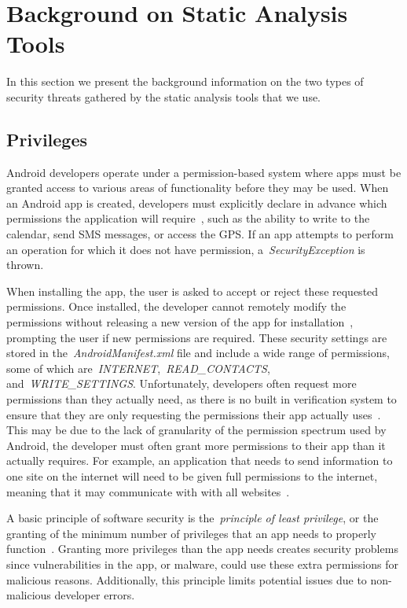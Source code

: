 \section{Background on Static Analysis Tools}

In this section we present the background information on the two types of security threats gathered by the static analysis tools that we use. %

\subsection{Privileges}
Android developers operate under a permission-based system where apps must be granted access to various areas of functionality before they may be used. When an Android app is created, developers must explicitly declare in advance which permissions the application will require~\cite{Felt:2011:APD:2046707.2046779}, such as the ability to write to the calendar, send SMS messages, or access the GPS. If an app attempts to perform an operation for which it does not have permission, a~\emph{SecurityException} is thrown. 

When installing the app, the user is asked to accept or reject these requested permissions. Once installed, the developer cannot remotely modify the permissions without releasing a new version of the app for installation~\cite{shaerpour2013trends}, prompting the user if new permissions are required. These security settings are stored in the~\emph{AndroidManifest.xml} file and include a wide range of permissions, some of which are~\emph{INTERNET},~\emph{READ\_CONTACTS}, and~\emph{WRITE\_SETTINGS}. Unfortunately, developers often request more permissions than they actually need, as there is no built in verification system to ensure that they are only requesting the permissions their app actually uses~\cite{Felt:2011:APD:2046707.2046779}. This may be due to the lack of granularity of the permission spectrum used by Android, the developer must often grant more permissions to their app than it actually requires. For example, an application that needs to send information to one site on the internet will need to be given full permissions to the internet, meaning that it may communicate with with all websites~\cite{jeon2011dr}.

A basic principle of software security is the~\emph{principle of least privilege}, or the granting of the minimum number of privileges that an app needs to properly function~\cite{saltzer1975protection}. Granting more privileges than the app needs creates security problems since vulnerabilities in the app, or malware, could use these extra permissions for malicious reasons. Additionally, this principle limits potential issues due to non-malicious developer errors.  

